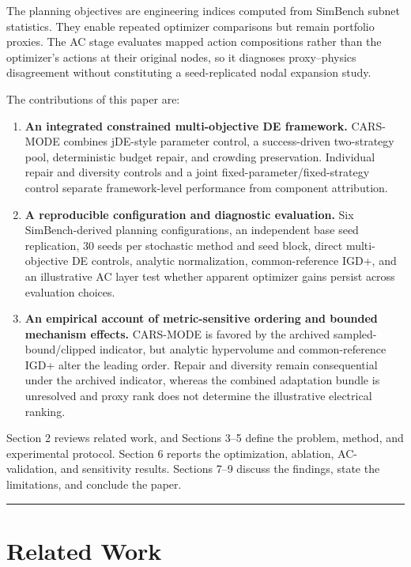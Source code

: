 \documentclass[energies,article,submit,moreauthors]{Definitions/mdpi}
\providecommand{\tightlist}{\setlength{\itemsep}{0pt}\setlength{\parskip}{0pt}}
\begin{document}
The planning objectives are engineering indices computed from SimBench subnet statistics. They enable repeated optimizer comparisons but remain portfolio proxies. The AC stage evaluates mapped action compositions rather than the optimizer's actions at their original nodes, so it diagnoses proxy--physics disagreement without constituting a seed-replicated nodal expansion study.

The contributions of this paper are:

\begin{enumerate}
\def\labelenumi{\arabic{enumi}.}
\tightlist
\item
  \textbf{An integrated constrained multi-objective DE framework.} CARS-MODE combines jDE-style parameter control, a success-driven two-strategy pool, deterministic budget repair, and crowding preservation. Individual repair and diversity controls and a joint fixed-parameter/fixed-strategy control separate framework-level performance from component attribution.
\item
  \textbf{A reproducible configuration and diagnostic evaluation.} Six SimBench-derived planning configurations, an independent base seed replication, 30 seeds per stochastic method and seed block, direct multi-objective DE controls, analytic normalization, common-reference IGD+, and an illustrative AC layer test whether apparent optimizer gains persist across evaluation choices.
\item
  \textbf{An empirical account of metric-sensitive ordering and bounded mechanism effects.} CARS-MODE is favored by the archived sampled-bound/clipped indicator, but analytic hypervolume and common-reference IGD+ alter the leading order. Repair and diversity remain consequential under the archived indicator, whereas the combined adaptation bundle is unresolved and proxy rank does not determine the illustrative electrical ranking.
\end{enumerate}

Section 2 reviews related work, and Sections 3--5 define the problem, method, and experimental protocol. Section 6 reports the optimization, ablation, AC-validation, and sensitivity results. Sections 7--9 discuss the findings, state the limitations, and conclude the paper.

\begin{center}\rule{0.5\linewidth}{0.5pt}\end{center}

\section{Related Work}\label{related-work}
\end{document}
